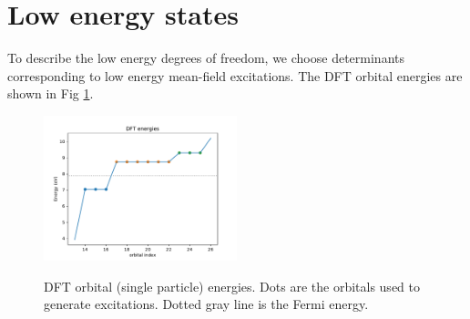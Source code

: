 %
%
%
%
%
%

\section {Low energy states}

To describe the low energy degrees of freedom, we choose determinants corresponding to low energy mean-field excitations.
The DFT orbital energies are shown in Fig \ref{fig:dft_energies}.

\begin{figure}[h]
\begin{center}
\includegraphics[width=0.5\textwidth]{images/dft_energies_k888.pdf}
\label{fig:dft_energies}
\caption{DFT orbital (single particle) energies. 
Dots are the orbitals used to generate excitations. 
Dotted gray line is the Fermi energy.}
\end{center}
\end{figure}

